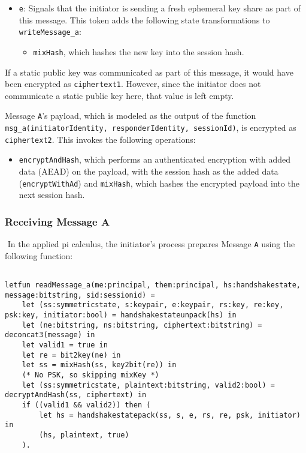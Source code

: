 \begin{itemize}

\item \texttt{e}: Signals that the initiator is sending a fresh ephemeral key share as part of this message. This token adds the following state transformations to \texttt{writeMessage\_a}:
\begin{itemize}

\item \texttt{mixHash}, which hashes the new key into the session hash.
\end{itemize}


\end{itemize}
If a static public key was communicated as part of this message, it would have been encrypted as \texttt{ciphertext1}. However, since the initiator does not communicate a static public key here, that value is left empty.


Message \texttt{A}'s payload, which is modeled as the output of the function \texttt{msg\_a(initiatorIdentity, responderIdentity, sessionId)}, is encrypted as \texttt{ciphertext2}. This invokes the following operations:


\begin{itemize}

\item \texttt{encryptAndHash}, which performs an authenticated encryption with added data (AEAD) on the payload, with the session hash as the added data (\texttt{encryptWithAd}) and \texttt{mixHash}, which hashes the encrypted payload into the next session hash.

\end{itemize}
\subsubsection{Receiving Message A}$ $
In the applied pi calculus, the initiator's process prepares Message \texttt{A} using the following function:


\begin{lstlisting}

letfun readMessage_a(me:principal, them:principal, hs:handshakestate, message:bitstring, sid:sessionid) =
	let (ss:symmetricstate, s:keypair, e:keypair, rs:key, re:key, psk:key, initiator:bool) = handshakestateunpack(hs) in
	let (ne:bitstring, ns:bitstring, ciphertext:bitstring) = deconcat3(message) in
	let valid1 = true in
	let re = bit2key(ne) in
	let ss = mixHash(ss, key2bit(re)) in
	(* No PSK, so skipping mixKey *)
	let (ss:symmetricstate, plaintext:bitstring, valid2:bool) = decryptAndHash(ss, ciphertext) in
	if ((valid1 && valid2)) then (
		let hs = handshakestatepack(ss, s, e, rs, re, psk, initiator) in
		(hs, plaintext, true)
	).

\end{lstlisting}

